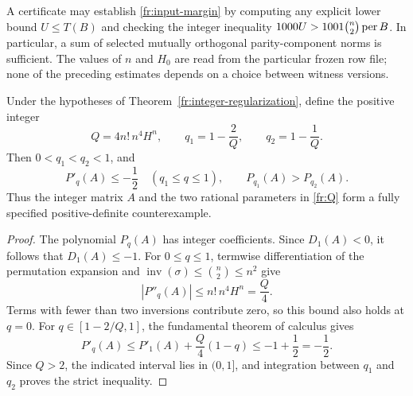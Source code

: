 A certificate may establish \eqref{fr:input-margin} by computing any
explicit lower bound \(U\le T(B)\) and checking the integer inequality
\(1000U>1001\binom n2\operatorname{per} B\). In particular, a sum of selected mutually
orthogonal parity-component norms is sufficient. The values of \(n\)
and \(H_0\) are read from the particular frozen row file; none of the
preceding estimates depends on a choice between witness versions.

\begin{corollary}
\label{fr:rational-interior}
Under the hypotheses of Theorem~\ref{fr:integer-regularization}, define
the positive integer
\begin{equation}\label{fr:Q}
 Q=4n!\,n^4H^n,
 \qquad q_1=1-\frac2Q,\qquad q_2=1-\frac1Q.
\end{equation}
Then \(0<q_1<q_2<1\), and
\begin{equation}\label{fr:strict-interior}
 P'_{q}(A)\le-\frac12\quad(q_1\le q\le1),
 \qquad P_{q_1}(A)>P_{q_2}(A).
\end{equation}
Thus the integer matrix \(A\) and the two rational parameters in
\eqref{fr:Q} form a fully specified positive-definite counterexample.
\end{corollary}

\begin{proof}
The polynomial \(P_q(A)\) has integer coefficients. Since
\(D_1(A)<0\), it follows that \(D_1(A)\le-1\).
For \(0\le q\le1\), termwise differentiation of the permutation
expansion and \(\operatorname{inv}(\sigma)\le\binom n2\le n^2\)
give
\[
 |P''_q(A)|\le n!\,n^4H^n=\frac Q4.
\]
Terms with fewer than two inversions contribute zero, so this bound
also holds at \(q=0\). For \(q\in[1-2/Q,1]\), the fundamental
theorem of calculus gives
\[
 P'_q(A)\le P'_1(A)+\frac Q4(1-q)\le-1+\frac12=-\frac12.
\]
Since \(Q>2\), the indicated interval lies in \((0,1]\), and
integration between \(q_1\) and \(q_2\) proves the strict inequality.
\end{proof}
